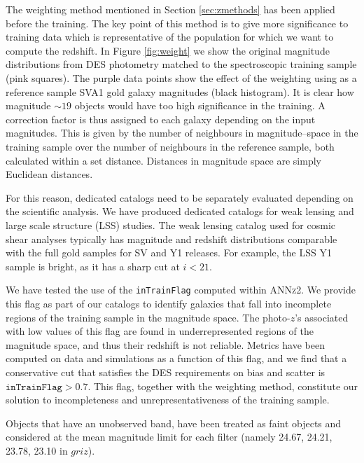 The weighting method mentioned in Section \ref{sec:zmethods} has been applied before the training. The key point of this method is to give more significance to training data which is representative of the population for which we want to compute the redshift. In Figure \ref{fig:weight} we show the original magnitude distributions from DES photometry matched to the spectroscopic training sample (pink squares). The purple data points show the effect of the weighting using as a reference sample SVA1 gold galaxy magnitudes (black histogram). It is clear how magnitude $\sim 19$ objects would have too high significance in the training. A correction factor is thus assigned to each galaxy depending on the input magnitudes. This is given by the number of neighbours in magnitude--space in the training sample over the number of neighbours in the reference sample, both calculated within a set distance. Distances in magnitude space are simply Euclidean distances.

For this reason, dedicated catalogs need to be separately evaluated depending on the scientific analysis. We have produced dedicated catalogs for weak lensing and large scale structure (LSS) studies. The weak lensing catalog used for cosmic shear analyses typically has magnitude and redshift distributions comparable with the full gold samples for SV and Y1 releases. For example, the LSS Y1 sample is bright, as it has a sharp cut at $i<21$.

We have tested the use of the \texttt{inTrainFlag} computed within \textsc{ANNz2}. We provide this flag as part of our catalogs to identify galaxies that fall into incomplete regions of the training sample in the magnitude space. The photo-$z$'s associated with low values of this flag are found in underrepresented regions of the magnitude space, and thus their redshift is not reliable. Metrics have been computed on data and simulations as a function of this flag, and we find that a conservative cut that satisfies the DES requirements on bias and scatter is $\texttt{inTrainFlag}>0.7$. This flag, together with the weighting method, constitute our solution to incompleteness and unrepresentativeness of the training sample. 

Objects that have an unobserved band, have been treated as faint objects and considered at the mean magnitude limit for each filter (namely 24.67, 24.21, 23.78, 23.10 in $griz$). 

